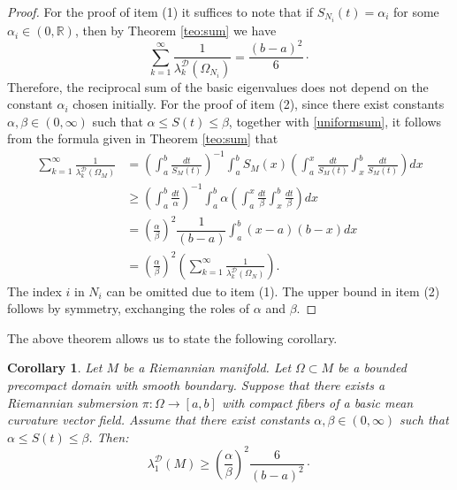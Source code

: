 \documentclass{amsart}
\newtheorem{corollary}[theorem]{Corollary}
\theoremstyle{definition}
\theoremstyle{remark}
\numberwithin{equation}{section}
\begin{document}
\begin{proof} For the proof of item (1) it suffices to note that if $S_{N_i}(t) = \alpha_i$ for some $\alpha_i \in (0,\mathbb{R})$, then by Theorem \ref{teo:sum} we have 
\begin{equation}\label{uniformsum}
 \sum_{k=1}^{\infty}\frac{1}{\lambda_k^{\mathcal{D}}(\Omega_{N_i})} = \frac{(b-a)^2}{6} \cdot
\end{equation}
Therefore, the reciprocal sum of the basic eigenvalues does not depend on the constant $\alpha_i$ chosen initially. For the proof of item (2), since there exist constants $\alpha, \beta \in (0,\infty)$ such that $\alpha \leq S(t) \leq \beta$, together with \eqref{uniformsum}, it follows from the formula given in Theorem \ref{teo:sum} that
\begin{equation*}
 \begin{aligned}
\sum_{k=1}^{\infty}\frac{1}{\lambda_k^{\mathcal{D}}(\Omega_M)} &= \left(\int_{a}^b\frac{dt}{S_M(t)}\right)^{-1}\int_{a}^b S_M(x)\left(\int_{a}^x\frac{dt}{S_M(t)}\int_x^b\frac{dt}{S_M(t)}\right)dx \\
 &\geq\left(\int_{a}^b\frac{dt}{\alpha}\right)^{-1}\int_{a}^b \alpha \left(\int_{a}^x\frac{dt}{\beta}\int_x^b\frac{dt}{\beta}\right)dx \\
 &= \left( \frac{\alpha}{\beta} \right)^2 \dfrac{1}{(b-a)}\int_{a}^b (x-a)(b-x)dx \\
 &= \left( \frac{\alpha}{\beta} \right)^2 \left( \sum_{k=1}^{\infty}\frac{1}{\lambda_k^{\mathcal{D}}(\Omega_N)} \right).
 \end{aligned}
\end{equation*}
The index $i$ in $N_i$ can be omitted due to item (1). The upper bound in item (2) follows by symmetry, exchanging the roles of $\alpha$ and $\beta$.
\end{proof}

The above theorem allows us to state the following corollary.

\begin{corollary}
Let $M$ be a Riemannian manifold. Let $\Omega\subset M$ be a bounded precompact domain with smooth boundary. Suppose that there exists a Riemannian submersion $\pi \colon \Omega \to [a, b]$ with compact fibers of a basic mean curvature vector field. Assume that there exist constants $\alpha, \beta \in (0,\infty)$ such that $\alpha \leq S(t) \leq \beta$. Then:
$$
\lambda_{1}^{\mathcal{D}}(M)\geq \left(\frac{\alpha}{\beta}\right)^2\frac{6}{(b-a)^{2}} \cdot
$$ 
\end{corollary}
\end{document}

